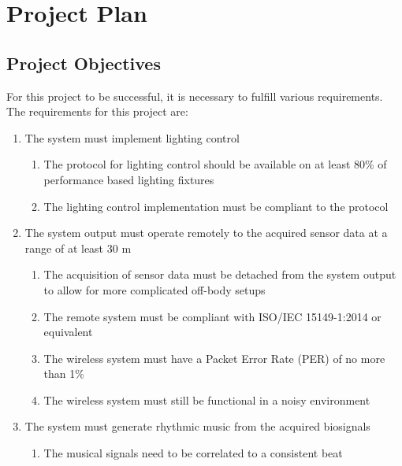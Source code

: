\section{Project Plan}
\subsection{Project Objectives}
For this project to be successful, it is necessary to fulfill various requirements.
The requirements for this project are:

\begin{enumerate}
    \item The system must implement lighting control
    \begin{enumerate}
        \item The protocol for lighting control should be available on at least 80\% of performance based lighting fixtures
        \item The lighting control implementation must be compliant to the protocol
    \end{enumerate}
    \item The system output must operate remotely to the acquired sensor data at a range of at least 30 m
    \begin{enumerate}
        \item The acquisition of sensor data must be detached from the system output
        to allow for more complicated off-body setups
        \item The remote system must be compliant with ISO/IEC 15149-1:2014 or equivalent
        \item The wireless system must have a Packet Error Rate (PER) of no more than 1\%
        \item The wireless system must still be functional in a noisy environment
    \end{enumerate}
    \item The system must generate rhythmic music from the acquired biosignals
    \begin{enumerate}
        \item The musical signals need to be correlated to a consistent beat
    \end{enumerate}
\end{enumerate}

